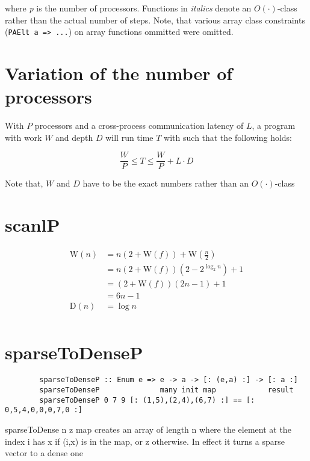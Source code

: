 \documentclass{article}
\newcommand{\W}[0]{\textrm{W}}
\newcommand{\D}[0]{\textrm{D}}
\begin{document}
        where \textit{p} is the number of processors.
        Functions in \textit{italics} denote an $O(\cdot)$-class rather than the actual number of steps.
        Note, that various array class constraints (\lstinline{PAElt a => ...}) on array functions ommitted were omitted.
        
    \section{Variation of the number of processors}
      With $P$ processors and a cross-process communication latency of $L$, a program with work $W$ and depth $D$ will run time $T$ with such that the following holds:
      
      $$ \frac{W}{P} \leq T \leq \frac{W}{P} + L \cdot D $$
      
      Note that, $W$ and $D$ have to be the exact numbers rather than an $O(\cdot)$-class
        
        
    \section{scanlP}
      \begin{equation}
      \begin{split}
      \W(n) & = n(2+\W(f)) + \W\left( \frac{n}{2} \right)   \\
        & = n(2 + \W(f))(2-2^{\log_{2} n}) + 1 \\
        & = (2 + \W(f))(2n-1) + 1 \\
        & = 6n - 1  \\
      \D(n) & = \log n \\
      \end{split}
      \end{equation}
    
    \section{sparseToDenseP}
      \begin{lstlisting}
        sparseToDenseP :: Enum e => e -> a -> [: (e,a) :] -> [: a :]
        sparseToDenseP              many init map            result
        sparseToDenseP 0 7 9 [: (1,5),(2,4),(6,7) :] == [: 0,5,4,0,0,0,7,0 :]
      \end{lstlisting}
        
      sparseToDense n z map creates an array of length n where the element
      at the index i has x if (i,x) is in the map, or z otherwise.
      In effect it turns a sparse vector to a dense one
      
\end{document}
